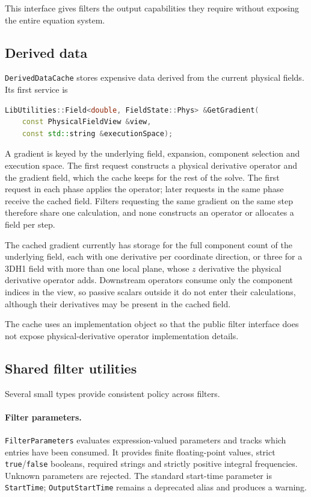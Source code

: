 This interface gives filters the output capabilities they require without
exposing the entire equation system.

\subsection{Derived data}

\texttt{DerivedDataCache} stores expensive data derived from the current
physical fields. Its first service is

\begin{lstlisting}[language=C++]
LibUtilities::Field<double, FieldState::Phys> &GetGradient(
    const PhysicalFieldView &view,
    const std::string &executionSpace);
\end{lstlisting}

A gradient is keyed by the underlying field, expansion, component selection
and execution space. The first request constructs a physical derivative
operator and the gradient field, which the cache keeps for the rest of the
solve. The first request in each phase applies the operator; later requests
in the same phase receive the cached field. Filters requesting the same
gradient on the same step therefore share one calculation, and none
constructs an operator or allocates a field per step.

The cached gradient currently has storage for the full component count of the
underlying field, each with one derivative per coordinate direction, or three
for a 3DH1 field with more than one local plane, whose $z$ derivative the
physical derivative operator adds. Downstream operators consume only the component indices in
the view, so passive scalars outside it do not enter their calculations,
although their derivatives may be present in the cached field.

The cache uses an implementation object so that the public filter interface
does not expose physical-derivative operator implementation details.

\subsection{Shared filter utilities}

Several small types provide consistent policy across filters.

\paragraph{Filter parameters.}
\texttt{FilterParameters} evaluates expression-valued parameters and tracks
which entries have been consumed. It provides finite floating-point values,
strict \texttt{true}/\texttt{false} booleans, required strings and strictly
positive integral frequencies. Unknown parameters are rejected. The standard
start-time parameter is \texttt{StartTime}; \texttt{OutputStartTime} remains a
deprecated alias and produces a warning.

